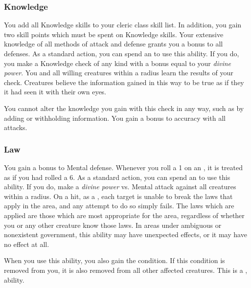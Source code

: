         \subsubsection{Knowledge}
             You add all Knowledge skills to your cleric class skill list.
            In addition, you gain two skill points which must be spent on Knowledge skills.
             Your extensive knowledge of all methods of attack and defense grants you a  bonus to all defenses.
             As a standard action, you can spend an  to use this ability.
            If you do, you make a Knowledge check of any kind with a bonus equal to your \textit{divine power}.
            You and all willing creatures within a \arealarge radius learn the results of your check.
            Creatures believe the information gained in this way to be true as if they it had seen it with their own eyes.

            You cannot alter the knowledge you gain with this check in any way, such as by adding or withholding information.
             You gain a  bonus to accuracy with all attacks.

        \subsubsection{Law}
             You gain a  bonus to Mental defense.
             Whenever you roll a 1 on an , it is treated as if you had rolled a 6.
             As a standard action, you can spend an  to use this ability.
            If you do, make a \textit{divine power} vs. Mental attack against all creatures within a \arealarge radius.
            On a hit, as a , each target is unable to break the laws that apply in the area, and any attempt to do so simply fails.
            The laws which are applied are those which are most appropriate for the area, regardless of whether you or any other creature know those laws.
            In areas under ambiguous or nonexistent government, this ability may have unexpected effects, or it may have no effect at all.

            When you use this ability, you also gain the condition.
            If this condition is removed from you, it is also removed from all other affected creatures.
            This is a ,  ability.

